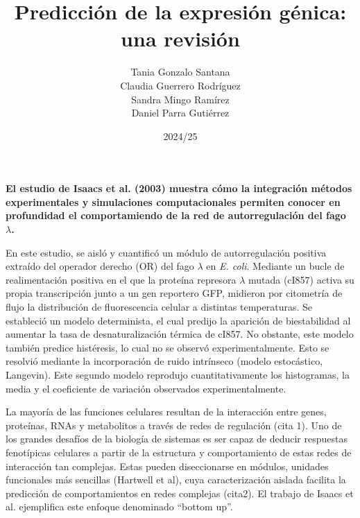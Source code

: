 \documentclass[nochap]{config/ejercicios}
\title{Predicción de la expresión génica: una revisión}
\author{Tania Gonzalo Santana \\ Claudia Guerrero Rodríguez \\ Sandra Mingo Ramírez \\ Daniel Parra Gutiérrez }
\date{2024/25}
\begin{document}
\maketitle

\large
\textbf{El estudio de Isaacs et al. (2003) muestra cómo la integración métodos experimentales y simulaciones computacionales permiten conocer en profundidad el comportamiendo de la red de autorregulación del fago $\lambda$.}
\normalsize

En este estudio, se aisló y cuantificó un módulo de autorregulación positiva extraído del operador derecho (OR) del fago $\lambda$ en \textit{E. coli}. Mediante un bucle de realimentación positiva en el que la proteína represora $\lambda$ mutada (cI857) activa su propia transcripción junto a un gen reportero GFP, midieron por citometría de flujo la distribución de fluorescencia celular a distintas temperaturas. Se estableció un modelo determinista, el cual predijo la aparición de biestabilidad al aumentar la tasa de desnaturalización térmica de cI857. No obstante, este modelo también predice histéresis, lo cual no se observó experimentalmente. Esto se resolvió mediante la incorporación de ruido intrínseco (modelo estocástico, Langevin). Este segundo modelo reprodujo cuantitativamente los histogramas, la media y el coeficiente de variación observados experimentalmente.

La mayoría de las funciones celulares resultan de la interacción entre genes, proteínas, RNAs y metabolitos a través de redes de regulación (cita 1). Uno de los grandes desafíos de la biología de sistemas es ser capaz de deducir respuestas fenotípicas celulares a partir de la estructura y comportamiento de estas redes de interacción tan complejas. Estas pueden diseccionarse en módulos, unidades funcionales más sencillas (Hartwell et al), cuya caracterización aislada facilita la predicción de comportamientos en redes complejas (cita2). El trabajo de Isaacs et al. ejemplifica este enfoque  denominado “bottom up”.
\end{document}
